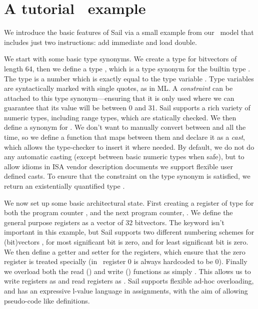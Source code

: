 \section{A tutorial \riscv\ example}
\label{sec:riscv}

We introduce the basic features of Sail via a small example from our
\riscv\ model that includes just two instructions: add immediate and
load double.

We start with some basic type synonyms. We create a type 
for bitvectors of length 64, then we define a type , which
is a type synonym for the builtin type . The type
 is a number which is exactly equal to the type variable
. Type variables are syntactically marked with single
quotes, as in ML. A \emph{constraint} can be attached to this type
synonym---ensuring that it is only used where we can guarantee that
its value will be between 0 and 31. Sail supports a rich variety of
numeric types, including range types, which are statically checked. We
then define a synonym  for . We don't want to
manually convert between  and  all the time, so
we define a function that maps between them and declare it as a
\emph{cast}, which allows the type-checker to insert it where
needed. By default, we do not do any automatic casting (except between
basic numeric types when safe), but to allow idioms in ISA vendor
description documents we support flexible user defined casts. To ensure
that the constraint on the  type synonym is satisfied, we
return an existentially quantified type .

\sailxlent
\sailregno
\sailregbits
\sailregbitstoregno
\sailfnregbitstoregno

We now set up some basic architectural state. First creating a
register of type  for both the program counter , and
the next program counter, . We define the general purpose
registers as a vector of 32  bitvectors. The 
keyword isn't important in this example, but Sail supports two
different numbering schemes for (bit)vectors , for most
significant bit is zero, and  for least significant bit is
zero. We then define a getter and setter for the registers, which
ensure that the zero register is treated specially (in
\riscv\ register 0 is always hardcoded to be 0). Finally we overload
both the read () and write () functions as simply
. This allows us to write registers as  and
read registers as . Sail supports flexible ad-hoc
overloading, and has an expressive l-value language in assignments,
with the aim of allowing pseudo-code like definitions.

